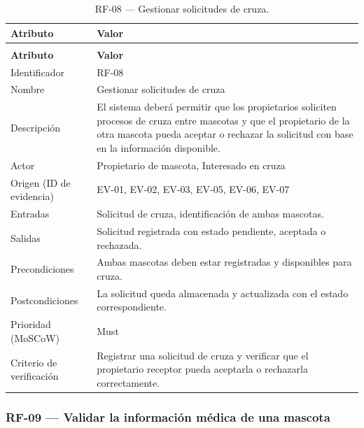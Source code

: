 \documentclass[journal,onecolumn]{IEEEtran}
\makeatletter
\newenvironment{atributos}[2]{%
	\small
	\begin{longtable}{@{}>{\raggedright\arraybackslash}p{4.2cm} >{\raggedright\arraybackslash}p{11.2cm}@{}}
		\caption{#2}\label{tab:#1}\\
		\toprule
		\textbf{Atributo} & \textbf{Valor} \\
		\midrule
		\endfirsthead
		\multicolumn{2}{@{}l}{\small\itshape (continuación)}\\
		\toprule
		\textbf{Atributo} & \textbf{Valor} \\
		\midrule
		\endhead
		\bottomrule
		\endlastfoot
	}{%
	\end{longtable}
	\normalsize
}
\makeatother
\begin{document}
	\begin{atributos}{RF-08}{RF-08 --- Gestionar solicitudes de cruza.}
		Identificador & RF-08 \\
		Nombre & Gestionar solicitudes de cruza \\
		Descripción & El sistema deberá permitir que los propietarios soliciten procesos de cruza entre mascotas y que el propietario de la otra mascota pueda aceptar o rechazar la solicitud con base en la información disponible. \\
		Actor & Propietario de mascota, Interesado en cruza \\
		Origen (ID de evidencia) & EV-01, EV-02, EV-03, EV-05, EV-06, EV-07 \\
		Entradas & Solicitud de cruza, identificación de ambas mascotas. \\
		Salidas & Solicitud registrada con estado pendiente, aceptada o rechazada. \\
		Precondiciones & Ambas mascotas deben estar registradas y disponibles para cruza. \\
		Postcondiciones & La solicitud queda almacenada y actualizada con el estado correspondiente. \\
		Prioridad (MoSCoW) & Must \\
		Criterio de verificación & Registrar una solicitud de cruza y verificar que el propietario receptor pueda aceptarla o rechazarla correctamente. \\
	\end{atributos}
	
	\subsubsection{RF-09 --- Validar la información médica de una mascota}
	
\end{document}
